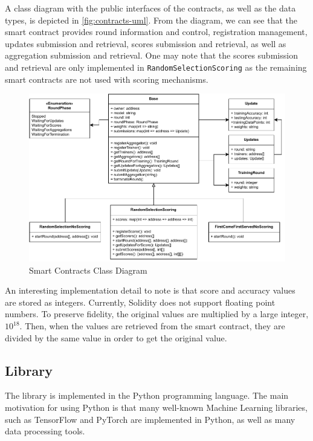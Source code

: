 A class diagram with the public interfaces of the contracts, as well as the data types, is depicted in \autoref{fig:contracts-uml}. From the diagram, we can see that the smart contract provides round information and control, registration management, updates submission and retrieval, scores submission and retrieval, as well as aggregation submission and retrieval. One may note that the scores submission and retrieval are only implemented in \texttt{RandomSelectionScoring} as the remaining smart contracts are not used with scoring mechanisms.

\begin{figure}[!ht]
    \centering
    \centering
    \includegraphics[width=1\textwidth]{graphics/smart-contract-uml.pdf}
    \caption{Smart Contracts Class Diagram}
    \label{fig:contracts-uml}
\end{figure}

An interesting implementation detail to note is that score and accuracy values are stored as integers. Currently, Solidity does not support floating point numbers. To preserve fidelity, the original values are multiplied by a large integer, $10^{18}$. Then, when the values are retrieved from the smart contract, they are divided by the same value in order to get the original value.

\subsection{Library}

The library is implemented in the Python \cite{10.5555/1593511} programming language. The main motivation for using Python is that many well-known Machine Learning libraries, such as TensorFlow \cite{tensorflow2015-whitepaper} and PyTorch \cite{NEURIPS2019_9015} are implemented in Python, as well as many data processing tools.

